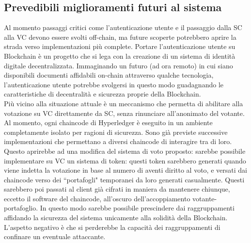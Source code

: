 	\subsection{Prevedibili miglioramenti futuri al sistema}
		Al momento passaggi critici come l'autenticazione utente e il passaggio dalla SC alla VC devono essere svolti off-chain, ma future scoperte potrebbero aprire la strada verso implementazioni più complete.
		Portare l'autenticazione utente su Blockchain è un progetto che si lega con la creazione di un sistema di identità digitale decentralizzata. Immaginando un futuro (ad ora remoto) in cui siano disponibili documenti affidabili on-chain attraverso qualche tecnologia, l'autenticazione utente potrebbe svolgersi in questo modo guadagnando le caratteristiche di decentralità e sicurezza proprie della Blockchain. \\
		Più vicino alla situazione attuale è un meccanismo che permetta di abilitare alla votazione su VC direttamente da SC, senza rinunciare all'anonimato del votante. Al momento, ogni chaincode di Hyperledger è eseguito in un ambiente completamente isolato per ragioni di sicurezza. Sono già previste successive implementazioni che permettano a diversi chaincode di interagire tra di loro. Questo aprirebbe ad una modifica del sistema di voto proposto: sarebbe possibile implementare su VC un sistema di token: questi token sarebbero generati quando viene indetta la votazione in base al numero di aventi diritto al voto, e versati dai chaincode verso dei ``portafogli" temporanei da loro generati casualmente. Questi sarebbero poi passati al client già cifrati in maniera da mantenere chiunque, eccetto il software del chaincode, all'oscuro dell'accoppiamento votante-portafoglio. In questo modo sarebbe possibile prescindere dai raggruppamenti affidando la sicurezza del sistema unicamente alla solidità della Blockchain. L'aspetto negativo è che si perderebbe la capacità dei raggruppamenti di confinare un eventuale attaccante.